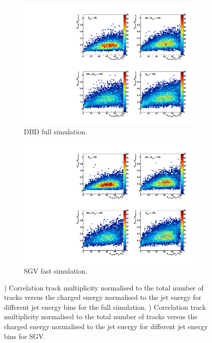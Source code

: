 \begin{figure}[htbp!]
  \centering
  \begin{subfigure}[t]{0.45\textwidth}
    \centering
    \includegraphics[width=1\linewidth]{Appendixes/fig_SGV/Correlation_Ntrack_FracEchajet_full.pdf}
    \caption{DBD full simulation.} \label{fig:correlation_distrib_full}
  \end{subfigure}
  \hfill
  \begin{subfigure}[t]{0.45\textwidth}
    \centering
    \includegraphics[width=1\linewidth]{Appendixes/fig_SGV/Correlation_Ntrack_FracEchajet_sgv.pdf}
    \caption{SGV fast simulation.} \label{fig:correlation_distrib_sgv}
  \end{subfigure}
  \caption{) Correlation track multiplicity normalised to the total number of tracks versus the charged energy normalised to the jet energy for different jet energy bins for the full simulation. ) Correlation track multiplicity normalised to the total number of tracks versus the charged energy normalised to the jet energy for different jet energy bins for SGV.}
\end{figure}

